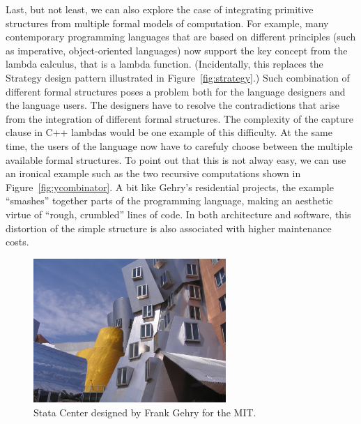 Last, but not least, we can also explore the case of integrating primitive structures from multiple
formal models of computation. For example, many contemporary programming languages that are based
on different principles (such as imperative, object-oriented languages) now support the
key concept from the lambda calculus, that is a lambda function. (Incidentally, this replaces
the Strategy design pattern illustrated in Figure~\ref{fig:strategy}.) Such combination of
different formal structures poses a problem both for the language designers and the language users.
The designers have to resolve the contradictions that arise from the integration of different
formal structures. The complexity of the capture clause in C++ lambdas would be one example
of this difficulty.
At the same time, the users of the language now have to carefuly choose between the multiple
available formal structures. To point out that this is not alway easy, we can use an ironical
example such as the two recursive computations shown in Figure~\ref{fig:ycombinator}. A bit like Gehry's residential projects, the
example ``smashes'' together parts of the programming language, making an aesthetic virtue of
``rough, crumbled'' lines of code. In both architecture and software, this distortion of the
simple structure is also associated with higher maintenance costs.

\begin{figure}
\centering
\vspace{-1em}
\includegraphics[width=0.65\textwidth]{fig/stata.jpg}
\caption{Stata Center designed by Frank Gehry for the MIT.}
\label{fig:stata}
\vspace{-0.5em}
\end{figure}

